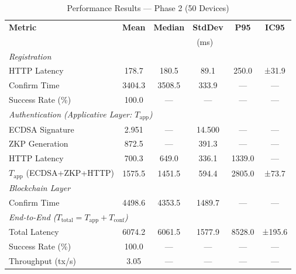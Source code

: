 %
%
\begin{table}[htbp]
\centering
\caption{Performance Results --- Phase 2 (50 Devices)}
\label{tab:phase2}
\begin{tabular}{lccccc}
\toprule
\textbf{Metric} & \textbf{Mean} & \textbf{Median} & \textbf{StdDev} & \textbf{P95} & \textbf{IC95} \\
                & \multicolumn{5}{c}{(ms)} \\
\midrule
\multicolumn{6}{l}{\textit{Registration}} \\
HTTP Latency      & 178.7 & 180.5 & 89.1 & 250.0 & ±31.9 \\
Confirm Time      & 3404.3 & 3508.5 & 333.9 & ---  & ---   \\
Success Rate (\%) & 100.0 & ---  & ---  & ---  & ---   \\
\midrule
\multicolumn{6}{l}{\textit{Authentication (Applicative Layer: $T_{\mathrm{app}}$)}} \\
ECDSA Signature   & 2.951 & ---  & 14.500 & ---  & ---   \\
ZKP Generation    & 872.5 & ---  & 391.3 & ---  & ---   \\
HTTP Latency      & 700.3 & 649.0 & 336.1 & 1339.0 & ---   \\
$T_{\mathrm{app}}$ (ECDSA+ZKP+HTTP) & 1575.5 & 1451.5 & 594.4 & 2805.0 & ±73.7 \\
\midrule
\multicolumn{6}{l}{\textit{Blockchain Layer}} \\
Confirm Time      & 4498.6 & 4353.5 & 1489.7 & ---  & ---   \\
\midrule
\multicolumn{6}{l}{\textit{End-to-End ($T_{\mathrm{total}} = T_{\mathrm{app}} + T_{\mathrm{conf}}$)}} \\
Total Latency     & 6074.2 & 6061.5 & 1577.9 & 8528.0 & ±195.6 \\
Success Rate (\%) & 100.0 & ---  & ---  & ---  & ---   \\
Throughput (tx/s) & 3.05 & ---  & ---  & ---  & ---   \\
\bottomrule
\end{tabular}
\end{table}
